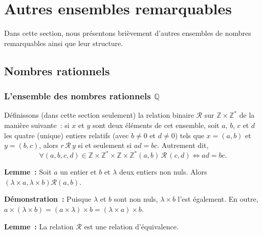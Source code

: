 \section{Autres ensembles remarquables}

\localtoc

Dans cette section, nous présentons brièvement d'autres ensembles de nombres remarquables ainsi que leur structure.

\subsection{Nombres rationnels}

\subsubsection{L'ensemble des nombres rationnels \texorpdfstring{$\mathbb{Q}$}{Q}}

Définissons (dans cette section seulement) la relation binaire $\mathcal{R}$ sur $\mathbb{Z} \times \mathbb{Z}^*$ de la manière suivante : si $x$ et $y$ sont deux éléments de cet ensemble, soit $a$, $b$, $c$ et $d$ les quatre (unique) entiers relatifs (avec $b \neq 0$ et $d \neq 0$) tels que $x = (a, b)$ et $y = (b, c)$, alors $r \, \mathcal{R} \, y$ si et seulement si $a d = b c$. 
Autrement dit, 
\begin{equation*}
    \forall (a, b, c, d) \in \mathbb{Z} \times \mathbb{Z}^* \times \mathbb{Z} \times \mathbb{Z}^*
    (a, b) \, \mathcal{R} \, (c, d)
    \Leftrightarrow a d = b c .
\end{equation*}

\medskip

\noindent\textbf{Lemme :} Soit $a$ un entier et $b$ et $\lambda$ deux entiers non nuls. 
    Alors $(\lambda \times a, \lambda \times b) \mathrel{\mathcal{R}} (a, b)$.

\medskip

\noindent\textbf{Démonstration :} Puisque $\lambda$ et $b$ sont non nuls, $\lambda \times b$ l'est également.
    En outre, $a \times (\lambda \times b) = (a \times \lambda) \times b = (\lambda \times a) \times b$.

    \done

\medskip

\noindent\textbf{Lemme :} La relation $\mathcal{R}$ est une relation d'équivalence. 

\medskip

